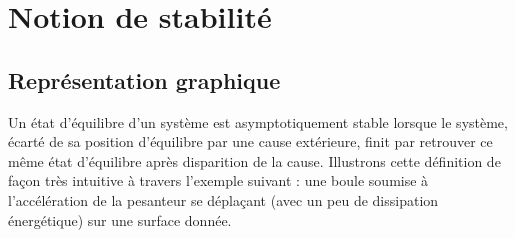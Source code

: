 \def\xxactivite{Cours}
\def\xxauteur{\textsl{Xavier Pessoles}}

\fichefalse
\proftrue
\tdfalse
\courstrue

\def\xxnumchapitre{Chapitre 1 \vspace{.2cm}}
\def\xxchapitre{\hspace{.12cm} Stabilité des systèmes}

\def\xxcompetences{%
\textsl{%
\textbf{Savoirs et compétences :}\\
\begin{itemize}[label=\ding{112},font=\color{bleuxp}] 
\item \textit{Mod3.C2 : } pôles dominants et réduction de l’ordre du modèle : principe, justification
\item \textit{Res2.C4 : } stabilité des SLCI : définition entrée bornée -- sortie bornée (EB -- SB)	
\item \textit{Res2.C5 : } stabilité des SLCI : équation caractéristique	
\item \textit{Res2.C6 : } stabilité des SLCI : position des pôles dans le plan complexe
\item \textit{Res2.C7 : } stabilité des SLCI : marges de stabilité (de gain et de phase)
\end{itemize}
}}


\def\xxfigures{
\texttt{[image: SoloWheel\_Orbit]}%
\\
\textit{SoloWheel Orbit.}
}%



%
\setlength{\columnseprule}{.1pt}

\pagestyle{fancy}


\section{Notion de stabilité}
\subsection{Représentation graphique \cite{1}}
Un état d'équilibre d'un système est asymptotiquement stable lorsque le système, écarté de sa position d'équilibre par une
cause extérieure, finit par retrouver ce même état d'équilibre après disparition de la
cause.
Illustrons cette définition de façon très intuitive à travers l'exemple suivant : une boule
soumise à l'accélération de la pesanteur se déplaçant (avec un peu de dissipation
énergétique) sur une surface donnée.


